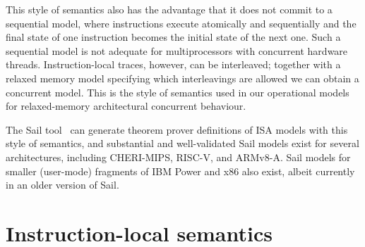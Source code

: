 \documentclass[11pt]{article}
\theoremstyle{definition}
\begin{document}
This style of semantics also has the advantage that it does not commit to a sequential model, where instructions execute atomically and sequentially and the final state of one instruction becomes the initial state of the next one.
Such a sequential model is not adequate for multiprocessors with concurrent hardware threads.
Instruction-local traces, however, can be interleaved;
together with a relaxed memory model specifying which interleavings
are allowed we can obtain a concurrent model.  This is the style of
semantics used in our operational models for relaxed-memory
architectural concurrent behaviour. 

The Sail tool~\cite{sail-sw,sail-popl2019} can generate theorem prover
definitions of ISA models with this style of semantics, and
substantial and well-validated Sail models exist for several
architectures, including CHERI-MIPS, RISC-V, and ARMv8-A.
Sail models for smaller (user-mode) fragments of IBM Power and x86 also
exist, albeit currently in an older version of Sail.

\section{Instruction-local semantics}
\label{sec:local-sem}
\end{document}
